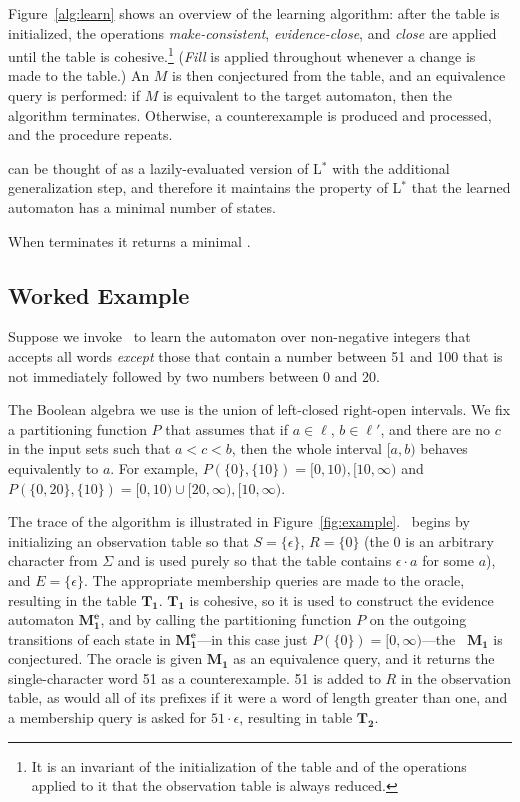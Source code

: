 Figure~\ref{alg:learn} shows an overview of the learning algorithm:
after the table is initialized,
the operations \emph{make-consistent},
\emph{evidence-close}, and \emph{close}
are applied until the table is cohesive.\footnote{
It is an invariant of the initialization of the table
and of the operations applied to it
that the observation table is always reduced.}
(\emph{Fill} is applied throughout whenever
a change is made to the table.)
An \SFA $M$ is then conjectured from the table,
and an equivalence query is performed:
if $M$ is equivalent to the target automaton,
then the algorithm terminates.
Otherwise, a counterexample is produced and processed,
and the procedure repeats.

\alg can be thought of as a lazily-evaluated version
of L$^*$ with the additional generalization step,
and therefore it maintains the property of L$^*$
that the learned automaton has a minimal
number of states.

\begin{theorem}\label{thm:min}
    When \alg terminates it returns a minimal \SFA.
\end{theorem}



\subsection{Worked Example}\label{subsec:ex}
Suppose we invoke \alg\ to learn the automaton
over non-negative integers that accepts
all words \emph{except} those that
contain a number between 51 and 100 that
is not immediately followed by two numbers
between 0 and 20.

The Boolean algebra we use is the union
of left-closed right-open intervals.
We fix a partitioning function $P$ that assumes
that if $a \in \ell$, $b \in \ell'$,
and there are no $c$ in the input sets
such that $a < c < b$, then the whole
interval $[a,b)$ behaves equivalently to $a$.
For example,
$P(\{0\},\{10\}) = [0,10), [10,\infty)$
and
$P(\{0,20\},\{10\}) = [0,10)\cup[20,\infty), [10,\infty)$.

The trace of the algorithm is illustrated
in Figure~\ref{fig:example}.
\alg\ begins by initializing an observation table
so that $S = \{\epsilon\}$, $R = \{0\}$
(the 0 is an arbitrary character from $\Sigma$
and is used purely so that the table contains
$\epsilon \cdot a$ for some $a$),
and $E = \{\epsilon\}$.
The appropriate membership queries are
made to the oracle, resulting in the table $\mathbf{T_1}$.
$\mathbf{T_1}$ is cohesive, so it is used to construct the evidence automaton
$\mathbf{M_1^e}$, and by calling the partitioning function
$P$ on the outgoing transitions of each state in $\mathbf{M_1^e}$---in
this case just $P(\{0\}) = [0,\infty)$---the
\SFA\ $\mathbf{M_1}$ is conjectured.
The oracle is given $\mathbf{M_1}$ as an equivalence query,
and it returns the single-character word 51
as a counterexample.
51 is added to $R$ in the observation table,
as would all of its prefixes if it were a word of length
greater than one,
and a membership query is asked for $51\cdot\epsilon$,
resulting in table $\mathbf{T_2}$.

